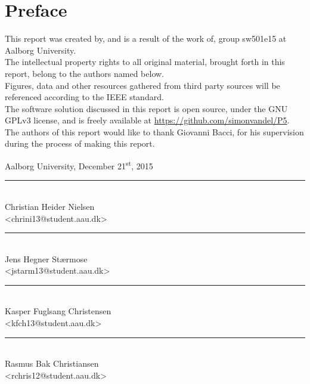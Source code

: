 \chapter{Preface}\label{ch:preface}
This report was created by, and is a result of the work of, group sw501e15 at Aalborg University. \\
The intellectual property rights to all original material, brought forth in this report, belong to the authors named below.\\
Figures, data and other resources gathered from third party sources will be referenced according to the IEEE standard. \\
The software solution discussed in this report is open source, under the GNU GPLv3 license, and is freely available at \url{https://github.com/simonvandel/P5}.\\

The authors of this report would like to thank Giovanni Bacci, for his supervision during the process of making this report.

\vspace{\baselineskip}\hfill Aalborg University, December 21\textsuperscript{st}, 2015
\vfill

\noindent
\begin{minipage}[b]{0.45\textwidth}
 \centering
 \rule{\textwidth}{0.5pt}\\
  Christian Heider Nielsen\\
 {\footnotesize <chrini13@student.aau.dk>}
\end{minipage}
%
\hfill
%
\begin{minipage}[b]{0.45\textwidth}
 \centering
 \rule{\textwidth}{0.5pt}\\
  Jens Hegner Stærmose\\
 {\footnotesize <jstarm13@student.aau.dk>}
\end{minipage}
%
\vspace{3\baselineskip}

\noindent
\begin{minipage}[b]{0.45\textwidth}
 \centering
 \rule{\textwidth}{0.5pt}\\
  Kasper Fuglsang Christensen\\
 {\footnotesize <kfch13@student.aau.dk>}
\end{minipage}
%
\hfill
%
\begin{minipage}[b]{0.45\textwidth}
 \centering
 \rule{\textwidth}{0.5pt}\\
  Rasmus Bak Christiansen\\
 {\footnotesize <rchris12@student.aau.dk>}
\end{minipage}
\vspace{3\baselineskip}

